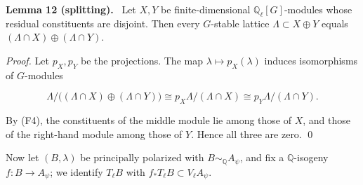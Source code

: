 \documentclass[11pt]{article}
\newenvironment{statement}[1]{\par\medskip\noindent\phantomsection\textbf{#1}\ }{\par\medskip}
\newcommand{\Q}{\mathbb Q}
\begin{document}
\begin{statement}{Lemma 12 (splitting).}\label{lemma-split}
Let \(X,Y\) be finite-dimensional \(\Q_\ell[G]\)-modules whose residual constituents are disjoint.
          Then every \(G\)-stable lattice \(\Lambda\subset X\oplus Y\) equals \((\Lambda\cap X)\oplus(\Lambda\cap Y)\).
\end{statement}

\emph{Proof.} Let \(p_X,p_Y\) be the projections. The map \(\lambda\mapsto p_X(\lambda)\) induces
      isomorphisms of \(G\)-modules

\[
\Lambda/\bigl((\Lambda\cap X)\oplus(\Lambda\cap Y)\bigr)\cong p_X\Lambda/(\Lambda\cap X)\cong p_Y\Lambda/(\Lambda\cap Y).
\]

By (F4), the constituents of the middle module lie among those of \(X\), and those of the right-hand
      module among those of \(Y\). Hence all three are zero. \qed

Now let \((B,\lambda)\) be principally polarized with \(B\sim_{\Q}A_\psi\), and fix a \(\Q\)-isogeny
      \(f:B\to A_\psi\); we identify \(T_\ell B\) with \(f_*T_\ell B\subset V_\ell A_\psi\).
\end{document}
